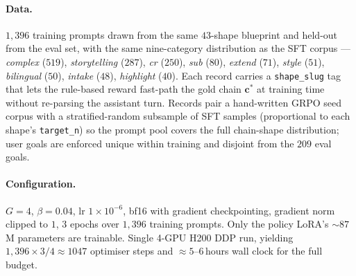 \paragraph{Data.}
$1{,}396$ training prompts drawn from the same $43$-shape blueprint
and held-out from the eval set, with the same nine-category
distribution as the SFT corpus — \emph{complex} ($519$),
\emph{storytelling} ($287$), \emph{cr} ($250$), \emph{sub} ($80$),
\emph{extend} ($71$), \emph{style} ($51$), \emph{bilingual} ($50$),
\emph{intake} ($48$), \emph{highlight} ($40$). Each record carries a
\texttt{shape\_slug} tag that lets the rule-based reward fast-path
the gold chain $\mathbf{c}^*$ at training time without re-parsing the
assistant turn. Records pair a hand-written GRPO seed corpus with a
stratified-random subsample of SFT samples (proportional to each
shape's \texttt{target\_n}) so the prompt pool covers the full
chain-shape distribution; user goals are enforced unique within
training and disjoint from the $209$ eval goals.

\paragraph{Configuration.}
$G\!=\!4$, $\beta\!=\!0.04$, lr $1\!\times\!10^{-6}$, bf16 with
gradient checkpointing, gradient norm clipped to $1$, $3$ epochs over
$1{,}396$ training prompts. Only the policy LoRA's $\sim 87$M
parameters are trainable. Single 4-GPU H200 DDP run, yielding
$1{,}396\!\times\!3 / 4 \approx 1047$ optimiser steps and
$\approx 5$--$6$\,hours wall clock for the full budget.
